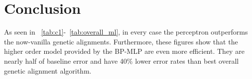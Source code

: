 \section {Conclusion}
\label{conclusion}

As seen in ~\ref{tab:c1}-~\ref{tab:overall_ml}, in every case the perceptron outperforms the now-vanilla genetic alignments. Furthermore, these figures show that the higher order model provided by the BP-MLP are even more efficient. They are nearly half of baseline error and have 40\% lower error rates than best overall genetic alignment algorithm.



